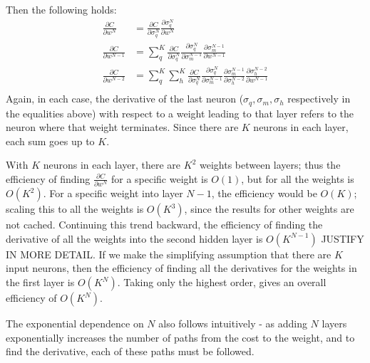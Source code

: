 \documentclass{article}
\begin{document}
   Then the following holds: %
      \begin{equation*} \begin{split}
        \frac{ \partial C}{ \partial w^{N} }
           &= \frac{ \partial C}{ \partial \sigma^N_q }  \frac{ \partial \sigma^N_q}{ \partial w^{N} } \\
        \frac{ \partial C}{ \partial w^{N-1} }
           &= \sum_q^K \frac{ \partial C}{ \partial \sigma^{N}_q }  \frac{ \partial \sigma^{N}_q }{\partial \sigma^{N-1}_m}  \frac{ \partial \sigma^{N-1}_m }{ \partial w^{N-1} } \\
        \frac{ \partial C}{ \partial w^{N-2} }
           &= \sum_q^K \sum_h^K \frac{ \partial C}{ \partial \sigma^{N}_q }  \frac{ \partial \sigma^{N}_q }{\partial \sigma^{N-1}_m}   \frac{ \partial \sigma^{N-1}_m }{\partial \sigma^{N-2}_h}   \frac{ \partial \sigma^{N-2}_h }{ \partial w^{N-1} } \\
      \end{split} \end{equation*}
   Again, in each case, the derivative of the last neuron ($\sigma_q, \sigma_m, \sigma_h$ respectively in the
   equalities above) with respect to a weight leading to that layer refers to the neuron where
   that weight terminates.
   Since there are $K$ neurons in each layer, each sum goes up to $K$.

   With $K$ neurons in each layer, there are $K^2$ weights between layers; thus the efficiency of
   finding $ \frac{ \partial C}{ \partial w^{N} } $ for a specific weight is $O(1)$, but for
   all the weights is $O(K^2)$.
   For a specific weight into layer $N-1$, the efficiency would be $O(K)$; scaling this to
   all the weights is $O(K^3)$, since the results for other weights are not cached.
   Continuing this trend backward, the efficiency of finding the derivative of all the weights
   into the second hidden layer is $O(K^{N-1})$ JUSTIFY IN MORE DETAIL.
   If we make the simplifying assumption that there are $K$ input neurons, then the efficiency
   of finding all the derivatives for the weights in the first layer is $O(K^{N})$.
   Taking only the highest order, gives an overall efficiency of $O(K^{N})$.

   The exponential dependence on $N$ also follows intuitively - as adding $N$ layers
   exponentially increases the number of paths from the cost to the weight, and to find
   the derivative, each of these paths must be followed.
\end{document}
